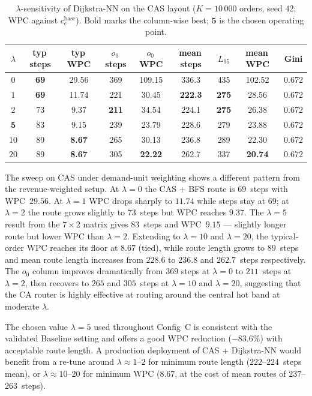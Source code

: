 \documentclass[12pt,a4paper]{article}
\begin{document}
\begin{table}[H]
\centering
\caption{$\lambda$-sensitivity of Dijkstra-NN on the CAS layout
  ($K = 10\,000$ orders, seed $42$; WPC against $c_e^{\text{base}}$).
  Bold marks the column-wise best; $\mathbf{5}$ is the chosen operating point.}
\label{tab:config_c_lambda_cas}
\renewcommand{\arraystretch}{1.20}
\begin{tabular}{ccccccccc}
\hline
$\lambda$ & typ\,steps & typ\,WPC & $o_0$\,steps & $o_0$\,WPC
          & mean\,steps & $L_{95}$ & mean\,WPC & Gini \\
\hline
$0$  &  \textbf{69} & 29.56 & 369 & 109.15 & 336.3 & 435 & 102.52 & 0.672 \\
$1$  &  \textbf{69} & 11.74 & 221 &  30.45 & \textbf{222.3} & \textbf{275} & 28.56 & 0.672 \\
$2$  &  73 &  9.37 & \textbf{211} &  34.54 & 224.1 & \textbf{275} & 26.38 & 0.672 \\
$\mathbf{5}$ & 83 & 9.15 & 239 & 23.79 & 228.6 & 279 & 23.88 & 0.672 \\
$10$ & 89 & \textbf{8.67} & 265 & 30.13 & 236.8 & 289 & 22.30 & 0.672 \\
$20$ & 89 & \textbf{8.67} & 305 & \textbf{22.22} & 262.7 & 337 & \textbf{20.74} & 0.672 \\
\hline
\end{tabular}
\end{table}

The sweep on CAS under demand-unit weighting shows a different pattern from the
revenue-weighted setup.
At $\lambda = 0$ the CAS + BFS route is $69$~steps with WPC~$29.56$.
At $\lambda = 1$ WPC drops sharply to $11.74$ while steps stay at $69$;
at $\lambda = 2$ the route grows slightly to $73$~steps but WPC reaches $9.37$.
The $\lambda = 5$ result from the $7 \times 2$ matrix gives $83$~steps
and WPC~$9.15$ --- slightly longer route but lower WPC than $\lambda = 2$.
Extending to $\lambda = 10$ and $\lambda = 20$, the typical-order WPC
reaches its floor at $8.67$ (tied), while route length grows to $89$~steps
and mean route length increases from $228.6$ to $236.8$ and $262.7$~steps
respectively.
The $o_0$ column improves dramatically from $369$ steps at $\lambda = 0$ to
$211$~steps at $\lambda = 2$, then recovers to $265$ and $305$~steps at
$\lambda = 10$ and $\lambda = 20$, suggesting that the CA router is highly
effective at routing around the central hot band at moderate $\lambda$.

The chosen value $\lambda = 5$ used throughout Config~C is consistent with the
validated Baseline setting and offers a good WPC reduction ($-83.6\%$) with
acceptable route length.
A production deployment of CAS + Dijkstra-NN would benefit from a re-tune
around $\lambda \approx 1$--$2$ for minimum route length ($222$--$224$~steps mean),
or $\lambda \approx 10$--$20$ for minimum WPC ($8.67$, at the cost of
mean routes of $237$--$263$~steps).
\end{document}
